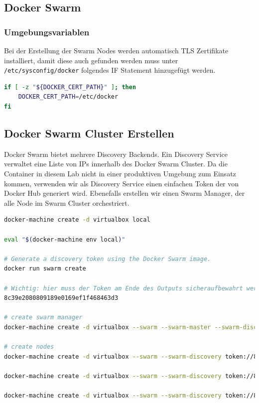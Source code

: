 \subsection{Docker Swarm}
\subsubsection{Umgebungsvariablen}
Bei der Erstellung der Swarm Nodes werden automatisch TLS Zertifikate installiert, damit diese auch gefunden werden muss unter \lstinline[]|/etc/sysconfig/docker| folgendes IF Statement hinzugefügt werden. 
\begin{lstlisting}[caption=/etc/sysconfig/docker, language=bash]
if [ -z "${DOCKER_CERT_PATH}" ]; then
	DOCKER_CERT_PATH=/etc/docker
fi
\end{lstlisting}

\subsection{Docker Swarm Cluster Erstellen}
Docker Swarm bietet mehrere Discovery Backends. Ein Discovery Service verwaltet eine Liste von IPs innerhalb des Docker Swarm Cluster. Da die Container in diesem Lab nicht in einer produktiven Umgebung zum Einsatz kommen, verwenden wir als Discovery Service einen einfachen Token der von Docker Hub generiert wird. Ebenefalls erstellen wir einen Swarm Manager, der alle Node im Swarm Cluster orchestriert.

\begin{lstlisting}[language=bash]
docker-machine create -d virtualbox local

eval "$(docker-machine env local)"

# Generate a discovery token using the Docker Swarm image.
docker run swarm create

# Wichtig: hier muss der Token am Ende des Outputs sicheraufbewahrt werden: 
8c39e2080809189e0169ef1f468463d3

# create swarm manager
docker-machine create -d virtualbox --swarm --swarm-master --swarm-discovery token://8c39e2080809189e0169ef1f468463d3 swarm-master

# create nodes
docker-machine create -d virtualbox --swarm --swarm-discovery token://8c39e2080809189e0169ef1f468463d3 kibana

docker-machine create -d virtualbox --swarm --swarm-discovery token://8c39e2080809189e0169ef1f468463d3 logstash

docker-machine create -d virtualbox --swarm --swarm-discovery token://8c39e2080809189e0169ef1f468463d3 elasticsearch
\end{lstlisting}


